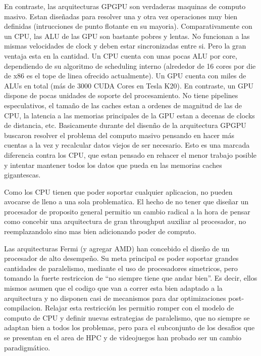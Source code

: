 En contraste, las arquitecturas GPGPU son verdaderas maquinas de computo masivo. Estan dise\~nadas para
resolver una y otra vez operaciones muy bien definidas (intrucciones de punto flotante en su mayoria).
Comparativamente con un CPU, las ALU de las GPU son bastante pobres y lentas. No funcionan a las mismas
velocidades de clock y deben estar sincronizadas entre si. Pero la gran ventaja esta en la cantidad.
Un CPU cuenta con unas pocas ALU por core, dependiendo de su algoritmo de scheduling interno
(alrededor de 16 cores por die de x86 es el tope de linea ofrecido actualmente). Un GPU cuenta con miles de ALUs en total
(m\'as de 3000 CUDA Cores en Tesla K20).
En contraste, un GPU dispone de pocas unidades de soporte del procesamiento. No tiene pipelines especulativos, el tama\~no de las caches
estan a ordenes de magnitud de las de CPU, la latencia a las memorias principales de la GPU estan a
decenas de clocks de distancia, etc. Basicamente durante del disen\~no de la arquitectura GPGPU
buscaron resolver el problema del computo masivo pensando en hacer m\'as cuentas a la vez y
recalcular datos viejos de ser necesario. Esto es una marcada diferencia contra los CPU, que estan
pensado en rehacer el menor trabajo posible y intentar mantener todos los datos que pueda en
las memorias caches gigantescas.

Como los CPU tienen que poder soportar cualquier aplicacion, no pueden avocarse de lleno a una sola
problematica. El hecho de no tener que dise\~nar un procesador de proposito general permitio un cambio radical
a la hora de pensar como concebir una arquitectura de gran throughput auxiliar al procesador, no reemplazandolo
sino mas bien adicionando poder de computo.~\cite{GlaskowskyFermi}

Las arquitecturas Fermi (y agregar AMD) han concebido el dise\~no de un procesador de alto desempe\~no.
Su meta principal es poder soportar grandes cantidades de paralelismo, mediante el uso de procesadores
simetricos, pero tomando la fuerte restriccion de ``no siempre tiene que andar bien''. Es decir, ellos
mismos asumen que el codigo que van a correr esta bien adaptado a la arquitectura y no disponen
casi de mecanismos para dar optimizaciones post-compilacion. Relajar esta restricci\'on
les permitio romper con el modelo de computo de CPU y definir nuevas estrategias de paralelismo,
que no siempre se adaptan bien a todos los problemas, pero para el subconjunto de los desafios que se
presentan en el area de HPC y de videojuegos han probado ser un cambio paradigm\'atico.

